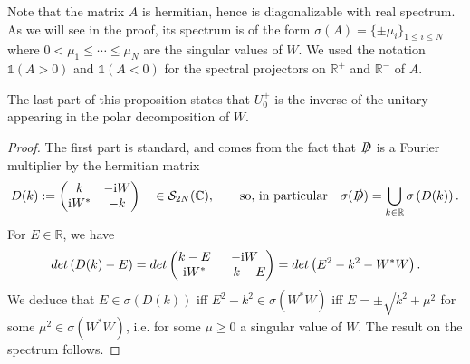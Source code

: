 \documentclass[11pt]{amsart}
\numberwithin{equation}{section} %
\newcommand\1{{\mathds 1}}
\def\C{{\mathbb C}}
\def\R{{\mathbb R}}
\def\ri{{\mathrm{i}}}
\def\cS{{\mathcal S}}
\def\det{{\rm det}}
\def\Dirac{\slashed{D}} %
\begin{document}
Note that the matrix $A$ is hermitian, hence is diagonalizable with real spectrum. As we will see in the proof, its spectrum is of the form $\sigma(A) = \{ \pm \mu_i\}_{1 \le i \le N}$ where $0 < \mu_1 \le \cdots \le \mu_N$ are the singular values of $W$. We used the notation $\1(A > 0)$ and $\1(A < 0)$ for the spectral projectors on $\R^+$ and $\R^-$ of $A$. 

The last part of this proposition states that $U_0^+$ is the inverse of the unitary appearing in the polar decomposition of $W$.

\begin{proof}
The first part is standard, and comes from the fact that $\Dirac$ is a Fourier multiplier by the hermitian matrix
\[
    D(k) := \begin{pmatrix}
    k & -\ri W \\ \ri W^* & -k
\end{pmatrix} \quad \in \cS_{2N}(\C), \qquad \text{so, in particular} \quad \sigma(\Dirac) = \bigcup_{k \in \R} \sigma\left( D(k) \right).
\]
For $E \in \R$, we have
\[
\det \left( D(k) - E \right)  = \det \begin{pmatrix}   k -E & - \ri W \\ \ri W^* & -k -E      \end{pmatrix} = \det \left( E^2 - k^2 - W^* W \right). 
\]
We deduce that $E \in \sigma(D(k))$ iff $E^2 - k^2 \in \sigma(W^* W)$ iff $E = \pm \sqrt{k^2 + \mu^2}$ for some $\mu^2 \in \sigma (W^* W)$, i.e. for some $\mu \ge 0$ a singular value of $W$. The result on the spectrum follows.

\medskip


\end{proof}
\end{document}

